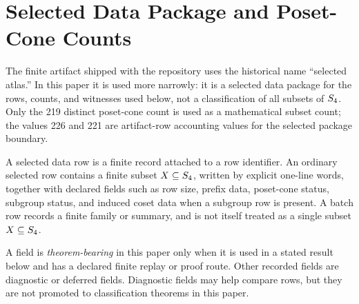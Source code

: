 \section{Selected Data Package and Poset-Cone Counts}
\label{sec:selected-atlas}

The finite artifact shipped with the repository uses the historical name ``selected atlas.'' In this paper it is used more narrowly: it is a selected data package for the rows, counts, and witnesses used below, not a classification of all subsets of \(S_4\). Only the 219 distinct poset-cone count is used as a mathematical subset count; the values 226 and 221 are artifact-row accounting values for the selected package boundary.

\begin{definition}
\label{def:selected-atlas-row}
A selected data row is a finite record attached to a row identifier. An ordinary selected row contains a finite subset \(X\subseteq S_4\), written by explicit one-line words, together with declared fields such as row size, prefix data, poset-cone status, subgroup status, and induced coset data when a subgroup row is present. A batch row records a finite family or summary, and is not itself treated as a single subset \(X\subseteq S_4\).
\end{definition}

\begin{definition}
\label{def:field-roles}
A field is \emph{theorem-bearing} in this paper only when it is used in a stated result below and has a declared finite replay or proof route. Other recorded fields are diagnostic or deferred fields. Diagnostic fields may help compare rows, but they are not promoted to classification theorems in this paper.
\end{definition}

